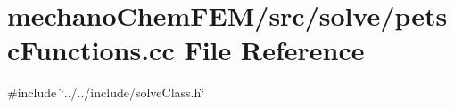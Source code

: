 \section{mechano\+Chem\+F\+E\+M/src/solve/petsc\+Functions.cc File Reference}
\label{petsc_functions_8cc}
{\ttfamily \#include \char`\"{}../../include/solve\+Class.\+h\char`\"{}}\newline
